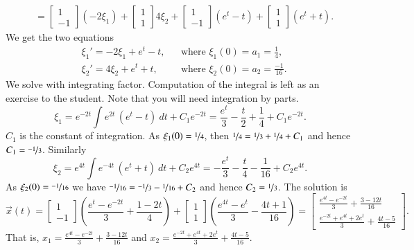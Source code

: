 \documentclass[12pt]{book}
\begin{document}
\begin{example}
\begin{equation*}
\begin{split}
\\
& =
\begin{bmatrix}
1 \\
-1
\end{bmatrix} (-2\xi_1) +
\begin{bmatrix}
1 \\
1
\end{bmatrix} 4\xi_2
+
\begin{bmatrix}
1 \\
-1
\end{bmatrix} (e^t - t)
+
\begin{bmatrix}
1 \\
1
\end{bmatrix} (e^t + t) .
\end{split}
\end{equation*}
We get the two equations
\begin{align*}
& \xi_1' = -2\xi_1 + e^t -t, & & \text{where } \xi_1(0) = a_1 = \frac{1}{4} , \\
& \xi_2' = 4\xi_2 + e^t + t, & & \text{where } \xi_2(0) = a_2 = \frac{-1}{16} .
\end{align*}
We solve with integrating factor.  Computation of the integral is left as
an exercise to the student.  Note that you will need integration by parts.
\begin{equation*}
\xi_1 = e^{-2t}\int e^{2t} \, (e^t-t) ~ dt + C_1 e^{-2t} = 
\frac{e^t}{3}-\frac{t}{2}+\frac{1}{4}+C_1 e^{-2t} .
\end{equation*}
$C_1$ is the constant of integration.
As $\xi_1(0) = \nicefrac{1}{4}$, then $\nicefrac{1}{4}= \nicefrac{1}{3}
+ \nicefrac{1}{4} + C_1$ and hence
$C_1 = \nicefrac{-1}{3}$.
Similarly
\begin{equation*}
\xi_2 = e^{4t}\int e^{-4t} \, (e^t+ t) ~ dt + C_2 e^{4t} = 
-\frac{e^t}{3}-\frac{t}{4}-\frac{1}{16} + C_2 e^{4t} .
\end{equation*}
As $\xi_2(0) = \nicefrac{-1}{16}$ we have $\nicefrac{-1}{16}= \nicefrac{-1}{3}
-\nicefrac{1}{16} + C_2$ and hence
$C_2 = \nicefrac{1}{3}$.
The solution is
\begin{equation*}
\vec{x}(t)=
\begin{bmatrix}
1 \\
-1
\end{bmatrix} \left( \frac{e^t-e^{-2t}}{3}+\frac{1-2t}{4} \right) +
\begin{bmatrix}
1 \\
1
\end{bmatrix} \left( \frac{e^{4t}-e^t}{3}-\frac{4t+1}{16} \right)
=
\begin{bmatrix}
\frac{e^{4t}-e^{-2t}}{3}+\frac{3-12t}{16} \\
\frac{e^{-2t}+e^{4t}+2e^t}{3}+\frac{4t-5}{16}
\end{bmatrix} .
\end{equation*}
That is,
$x_1 = \frac{e^{4t}-e^{-2t}}{3}+\frac{3-12t}{16}$
and
$x_2 = \frac{e^{-2t}+e^{4t}+2e^t}{3}+\frac{4t-5}{16}$.
\end{example}
\end{document}
